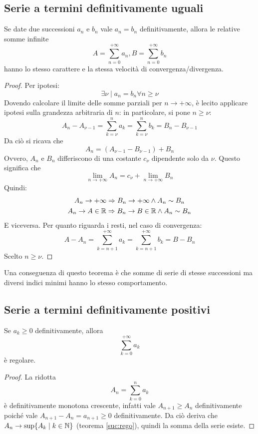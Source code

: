 \subsection{Serie a termini definitivamente uguali}
\begin{teor}
	\label{ser:defugu}
	Se date due successioni $a_n$ e $b_n$ vale $a_n=b_n$ definitivamente, allora le relative somme infinite
	\[
		A=\sum_{n=0}^{+\infty} a_n, B=\sum_{n=0}^{+\infty} b_n
	\]
	hanno lo stesso carattere e la stessa velocità di convergenza/divergenza.
\end{teor}
\begin{proof}
	Per ipotesi:
	\[
		\exists\nu\mid a_n=b_n\forall n\geq\nu
	\]
	Dovendo calcolare il limite delle somme parziali per $n\to+\infty$, è lecito applicare ipotesi sulla grandezza arbitraria di $n$: in particolare, si pone $n\geq\nu$:
	\[
		A_n-A_{\nu-1}=\sum_{k=\nu}^n a_k=\sum_{k=\nu}^n b_k=B_n-B_{\nu-1}
	\]
	Da ciò si ricava che
	\[
		A_n=(A_{\nu-1}-B_{\nu-1})+B_n
	\]
	Ovvero, $A_n$ e $B_n$ differiscono di una costante $c_\nu$ dipendente solo da $\nu$. Questo significa che
	\[
		\lim_{n\to+\infty} A_n=c_\nu+\lim_{n\to+\infty} B_n
	\]
	Quindi:
	\begin{gather}
		A_n\to+\infty\Rightarrow B_n\to+\infty\land A_n\sim B_n\\
		A_n\to A\in\mathbb{R}\Rightarrow B_n\to B\in\mathbb{R}\land A_n\sim B_n
	\end{gather}
	E viceversa. Per quanto riguarda i resti, nel caso di convergenza:
	\[
		A-A_n=\sum_{k=n+1}^{+\infty} a_k=\sum_{k=n+1}^{+\infty} b_k=B-B_n
	\]
	Scelto $n\geq\nu$.
\end{proof}
Una conseguenza di questo teorema è che somme di serie di stesse successioni ma diversi indici minimi hanno lo stesso comportamento.

\subsection{Serie a termini definitivamente positivi}
\begin{teor}
	\label{ser:defpos}
	Se $a_k\geq0$ definitivamente, allora
	\[
		\sum_{k=0}^{+\infty} a_k
	\]
	è regolare.
\end{teor}
\begin{proof}
	La ridotta
	\[
		A_n=\sum_{k=0}^n a_k
	\]
	è definitivamente monotona crescente, infatti vale $A_{n+1}\geq A_n$ definitivamente poiché vale $A_{n+1}-A_n=a_{n+1}\geq 0$ definitivamente. Da ciò deriva che $A_n\to\text{sup}\{A_k\mid k\in\mathbb{N}\}$ (teorema \vref{suc:rego}), quindi la somma della serie esiste.
\end{proof}

